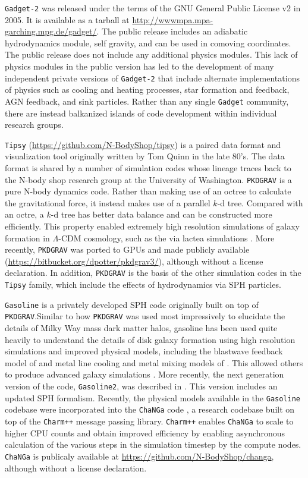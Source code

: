 \documentclass[11pt,twoside]{article}
\begin{document}
\texttt{Gadget-2} was released under the terms of the GNU General Public License v2 in 2005. It is available as a tarball at \url{http://wwwmpa.mpa-garching.mpg.de/gadget/}. The public release includes an adiabatic hydrodynamics module, self gravity, and can be used in comoving coordinates. The public release does not include any additional physics modules. This lack of physics modules in the public version has led to the development of many independent private versions of \texttt{Gadget-2} that include alternate implementations of physics such as cooling and heating processes, star formation and feedback, AGN feedback, and sink particles. Rather than any single \texttt{Gadget} community, there are instead balkanized islands of code development within individual research groups.

\texttt{Tipsy} (\url{https://github.com/N-BodyShop/tipsy}) is a paired data format and visualization tool originally written by Tom Quinn in the late 80's. The data format is shared by a number of simulation codes whose lineage traces back to the N-body shop research group at the University of Washington. \texttt{PKDGRAV} \citep{stadel2001} is a pure N-body dynamics code. Rather than making use of an octree to calculate the gravitational force, it instead makes use of a parallel $k$-d tree. Compared with an octre, a $k$-d tree has better data balance and can be constructed more efficiently. This property enabled extremely high resolution simulations of galaxy formation in $\Lambda$-CDM cosmology, such as the via lactea simulations \citep{diemand2008}. More recently, \texttt{PKDGRAV} was ported to GPUs \citep{potter2017} and made publicly available (\url{https://bitbucket.org/dpotter/pkdgrav3/}), although without a license declaration. In addition, \texttt{PKDGRAV} is the basis of the other simulation codes in the \texttt{Tipsy} family, which include the effects of hydrodynamics via SPH particles.

\texttt{Gasoline} \citep{wadsley2004} is a privately developed SPH code originally built on top of \texttt{PKDGRAV}.\@ Similar to how \texttt{PKDGRAV} was used most impressively to elucidate the details of Milky Way mass dark matter halos, gasoline has been used quite heavily to understand the details of disk galaxy formation using high resolution simulations and improved physical models, including the blastwave feedback model of \citet{stinson2006} and metal line cooling and metal mixing models of \citet{shen2010}. This allowed others to produce advanced galaxy simulations \citep{guedes2011, pontzen2012, zolotov2012}. More recently, the next generation version of the code, \texttt{Gasoline2}, was described in \citet{wadsley2017}. This version includes an updated SPH formalism. Recently, the physical models available in the \texttt{Gasoline} codebase were incorporated into the \texttt{ChaNGa} code \citep{jetley2008}, a research codebase built on top of the \texttt{Charm++} message passing library. \texttt{Charm++} enables \texttt{ChaNGa} to scale to higher CPU counts and obtain improved efficiency by enabling asynchronous calculation of the various steps in the simulation timestep by the compute nodes. \texttt{ChaNGa} is publicaly available at \url{https://github.com/N-BodyShop/changa}, although without a license declaration.
\end{document}
